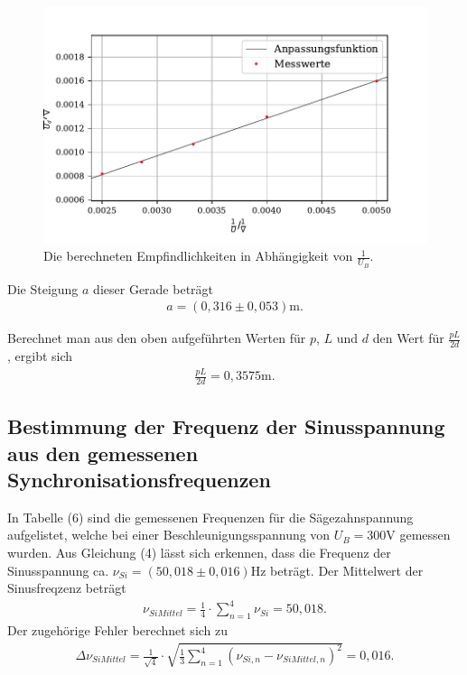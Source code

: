 \begin{figure}[H]
  \centering
  \includegraphics{plot8.pdf}
  \caption{Die berechneten Empfindlichkeiten in Abhängigkeit von $\frac{1}{U_B}$.}
  \label{fig:plot}
\end{figure}

\noindent Die Steigung $a$ dieser Gerade beträgt
\begin{align*}
a = (0,316 \pm 0,053)  \si{\meter} .
\end{align*}

\noindent Berechnet man aus den oben aufgeführten Werten für $p$, $L$ und $d$ den Wert für $\frac{pL}{2d}$, ergibt sich
\begin{align*}
\frac{pL}{2d} = 0,3575 \si{\meter}.
\end{align*}




\subsection{Bestimmung der Frequenz der Sinusspannung aus den gemessenen Synchronisationsfrequenzen}

In Tabelle (6) sind die gemessenen Frequenzen für die Sägezahnspannung aufgelistet, welche bei einer Beschleunigungsspannung von $U_B = 300 \si{\volt}$ gemessen wurden.
Aus Gleichung (4) lässt sich erkennen, dass die Frequenz der Sinusspannung ca. $\nu_{Si} = (50,018 \pm 0,016) \si{\hertz}$ beträgt.
Der Mittelwert der Sinusfreqzenz beträgt
\begin{align*}
\nu_{SiMittel} = \frac{1}{4}\cdot \sum_{n=1}^4 \nu_{Si} = 50,018 .
\end{align*}
Der zugehörige Fehler berechnet sich zu
\begin{align*}
\Delta\nu_{SiMittel} = \frac{1}{\sqrt{4}} \cdot \sqrt{\frac{1}{3} \sum_{n=1}^4 (\nu_{Si,n} - \nu_{SiMittel,n})^2} = 0,016 .
\end{align*}


